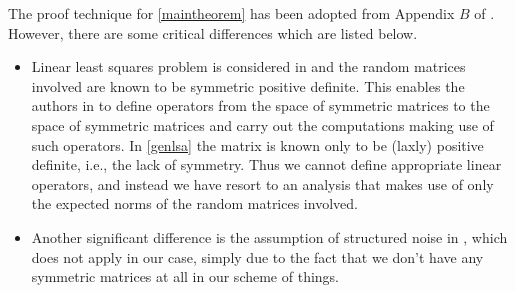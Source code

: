 The proof technique for \cref{maintheorem} has been adopted from Appendix $B$ of \cite{bachharder} . However, there are some critical differences which are listed below.
\begin{itemize}
\item Linear least squares problem is considered in \cite{bachharder} and the random matrices involved are known to be symmetric positive definite. This enables the authors in \cite{bachharder} to define operators from the space of symmetric matrices to the space of symmetric matrices and carry out the computations making use of such operators. In \cref{genlsa} the matrix is known only to be (laxly) positive definite, i.e., the lack of symmetry.
Thus we cannot define appropriate linear operators, and instead we have resort to an analysis that makes use of only the expected norms of the random matrices involved.
\item Another significant difference is the assumption of structured noise in \cite{bachharder}, which does not apply in our case, simply due to the fact that we don't have any symmetric matrices at all in our scheme of things.
\end{itemize}

